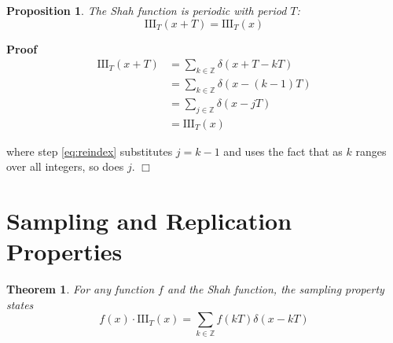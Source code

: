 \documentclass{article}
\newenvironment{proof}{\noindent\textbf{Proof\ }}{\hspace*{\fill}$\Box$\medskip}
\newtheorem{proposition}{Proposition}
\newtheorem{theorem}{Theorem}
\begin{document}
\begin{proposition}
  \label{prop:shah_periodicity}The Shah function is periodic with period $T$:
  \begin{equation}
    \label{eq:shah_periodic} \text{III}_T (x + T) = \text{III}_T (x)
  \end{equation}
\end{proposition}

\begin{proof}
  \begin{align}
    \text{III}_T (x + T) & = \sum_{k \in \mathbb{Z}} \delta (x + T - kT) 
    \label{eq:period_shift}\\
    & = \sum_{k \in \mathbb{Z}} \delta (x - (k - 1) T) 
    \label{eq:index_adjust}\\
    & = \sum_{j \in \mathbb{Z}} \delta (x - jT)  \label{eq:reindex}\\
    & = \text{III}_T (x)  \label{eq:period_result}
  \end{align}
  
  where step \eqref{eq:reindex} substitutes $j = k - 1$ and uses the fact that
  as $k$ ranges over all integers, so does $j$.
\end{proof}

\section{Sampling and Replication Properties}

\begin{theorem}
  \label{thm:sampling_property}For any function $f$ and the Shah function, the
  sampling property states
  \begin{equation}
    \label{eq:sampling} f (x) \cdot \text{III}_T (x) = \sum_{k \in \mathbb{Z}}
    f (kT) \delta (x - kT)
  \end{equation}
\end{theorem}
\end{document}
